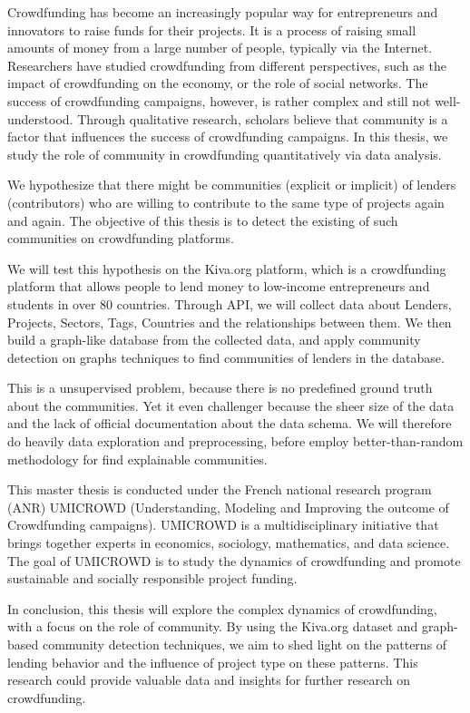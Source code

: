 Crowdfunding has become an increasingly popular way for entrepreneurs and innovators to raise funds for their projects.
It is a process of raising small amounts of money from a large number of people, typically via the Internet.
Researchers have studied crowdfunding from different perspectives, such as the impact of crowdfunding on the economy, or the role of social networks.
The success of crowdfunding campaigns, however, is rather complex and still not well-understood.
Through qualitative research, scholars believe that community is a factor that influences the success of crowdfunding campaigns.
In this thesis, we study the role of community in crowdfunding quantitatively via data analysis.

We hypothesize that there might be communities (explicit or implicit) of lenders (contributors) who are willing to contribute to the same type of projects again and again.
The objective of this thesis is to detect the existing of such communities on crowdfunding platforms.

We will test this hypothesis on the Kiva.org platform,
which is a crowdfunding platform that allows people to lend money to low-income entrepreneurs and students in over 80 countries.
Through API, we will collect data about Lenders, Projects, Sectors, Tags, Countries and the relationships between them.
We then build a graph-like database from the collected data,
and apply community detection on graphs techniques to find communities of lenders in the database.

This is a unsupervised problem, because there is no predefined ground truth about the communities.
Yet it even challenger because the sheer size of the data and the lack of official documentation about the data schema.
We will therefore do heavily data exploration and preprocessing,
before employ better-than-random methodology for find explainable communities.

This master thesis is conducted under the French national research program (ANR) UMICROWD (Understanding, Modeling and Improving the outcome of Crowdfunding campaigns).
UMICROWD is a multidisciplinary initiative that brings together experts in economics, sociology, mathematics, and data science.
The goal of UMICROWD is to study the dynamics of crowdfunding and promote sustainable and socially responsible project funding.

In conclusion, this thesis will explore the complex dynamics of crowdfunding, with a focus on the role of community.
By using the Kiva.org dataset and graph-based community detection techniques,
we aim to shed light on the patterns of lending behavior and the influence of project type on these patterns.
This research could provide valuable data and insights for further research on crowdfunding.

